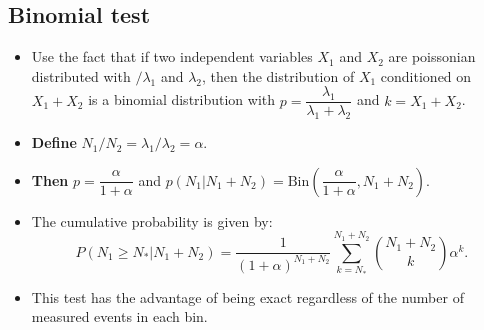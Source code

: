 \documentclass[12pt,a4paper]{article}
\begin{document}
\subsection{Binomial test}
\begin{itemize}
    \item Use the fact that if two independent variables \(X_1\) and \(X_2\) are poissonian distributed with \(/\lambda_1\) and $\lambda_2$, then the distribution of \(X_1\) conditioned on \(X_1 + X_2\) is a binomial distribution with \(p = \dfrac{\lambda_1}{\lambda_1 + \lambda_2}\) and \(k = X_1 + X_2\).
    \item \textbf{Define} \(N_1/N_2 = \lambda_1/\lambda_2 = \alpha\).
    \item \textbf{Then} \(p = \dfrac{\alpha}{1+\alpha}\) and \(p(N_1 | N_1 + N_2) = \mathrm{Bin}(\dfrac{\alpha}{1+\alpha}, N_1 + N_2)\).
    \item The cumulative probability is given by: \begin{equation} \label{eq:binomial}
        P(N_1 \geq N_\ast | N_1 + N_2) = \dfrac{1}{(1+\alpha)^{N_1 + N_2}} \sum_{k=N_\ast}^{N_1 + N_2} {{N_1 + N_2}\choose k} \alpha^k \text{.}
    \end{equation}
    \item This test has the advantage of being exact regardless of the number of measured events in each bin.
\end{itemize}
\end{document}
